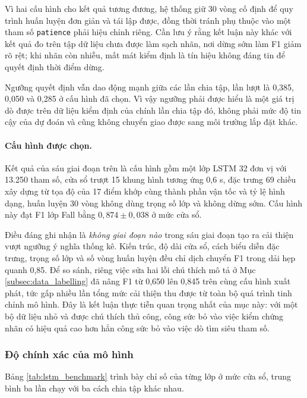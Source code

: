 Vì hai cấu hình cho kết quả tương đương, hệ thống giữ 30 vòng cố định để quy trình huấn luyện đơn giản và tái lập được, đồng thời tránh phụ thuộc vào một tham số \texttt{patience} phải hiệu chỉnh riêng. Cần lưu ý rằng kết luận này khác với kết quả đo trên tập dữ liệu chưa được làm sạch nhãn, nơi dừng sớm làm F1 giảm rõ rệt; khi nhãn còn nhiễu, mất mát kiểm định là tín hiệu không đáng tin để quyết định thời điểm dừng.

Ngưỡng quyết định vẫn dao động mạnh giữa các lần chia tập, lần lượt là 0,385, 0,050 và 0,285 ở cấu hình đã chọn. Vì vậy ngưỡng phải được hiểu là một giá trị dò được trên dữ liệu kiểm định của chính lần chia tập đó, không phải mức độ tin cậy của dự đoán và cũng không chuyển giao được sang môi trường lắp đặt khác.

\paragraph{Cấu hình được chọn.}
Kết quả của sáu giai đoạn trên là cấu hình gồm một lớp LSTM 32 đơn vị với 13.250 tham số, cửa sổ trượt 15 khung hình tương ứng 0,6 s, đặc trưng 69 chiều xây dựng từ tọa độ của 17 điểm khớp cùng thành phần vận tốc và tỷ lệ hình dạng, huấn luyện 30 vòng không dùng trọng số lớp và không dừng sớm. Cấu hình này đạt F1 lớp Fall bằng $0{,}874\pm0{,}038$ ở mức cửa sổ.

Điều đáng ghi nhận là \emph{không giai đoạn nào} trong sáu giai đoạn tạo ra cải thiện vượt ngưỡng ý nghĩa thống kê. Kiến trúc, độ dài cửa sổ, cách biểu diễn đặc trưng, trọng số lớp và số vòng huấn luyện đều chỉ dịch chuyển F1 trong dải hẹp quanh 0,85. Để so sánh, riêng việc sửa hai lỗi chú thích mô tả ở Mục \ref{subsec:data_labelling} đã nâng F1 từ 0,650 lên 0,845 trên cùng cấu hình xuất phát, tức gấp nhiều lần tổng mức cải thiện thu được từ toàn bộ quá trình tinh chỉnh mô hình. Đây là kết luận thực tiễn quan trọng nhất của mục này: với một bộ dữ liệu nhỏ và được chú thích thủ công, công sức bỏ vào việc kiểm chứng nhãn có hiệu quả cao hơn hẳn công sức bỏ vào việc dò tìm siêu tham số.

\subsubsection{Độ chính xác của mô hình}

Bảng \ref{tab:lstm_benchmark} trình bày chỉ số của từng lớp ở mức cửa sổ, trung bình ba lần chạy với ba cách chia tập khác nhau.

